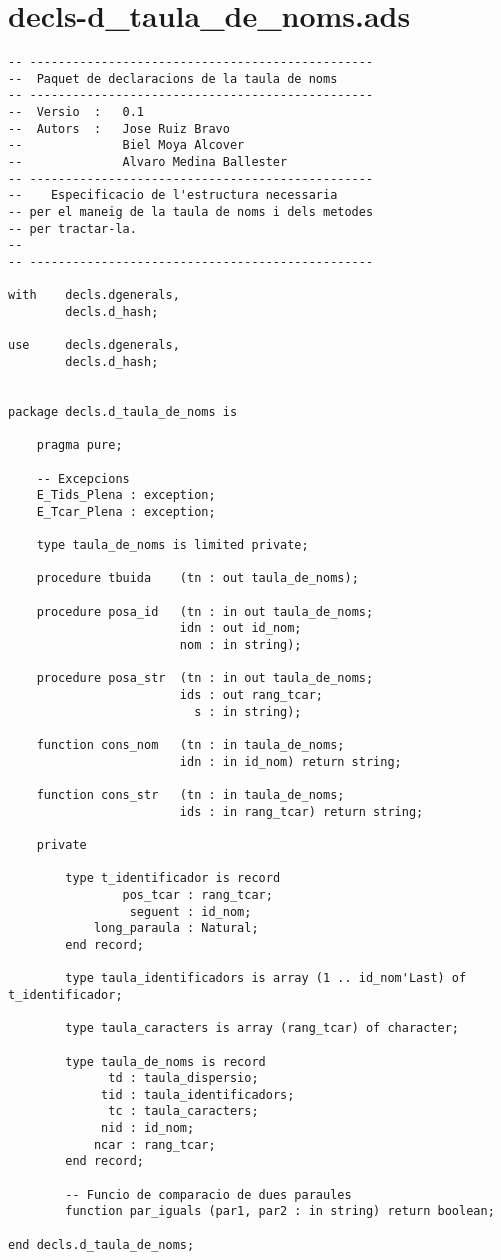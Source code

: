 \documentclass[10pt]{report}
\begin{document}
    \section{decls-d\_taula\_de\_noms.ads}
    \begin{lstlisting}[style=Ada]
-- ------------------------------------------------
--  Paquet de declaracions de la taula de noms
-- ------------------------------------------------
--  Versio  :   0.1
--  Autors  :   Jose Ruiz Bravo
--              Biel Moya Alcover
--              Alvaro Medina Ballester
-- ------------------------------------------------
--    Especificacio de l'estructura necessaria
-- per el maneig de la taula de noms i dels metodes
-- per tractar-la.
--
-- ------------------------------------------------

with    decls.dgenerals,
        decls.d_hash; 
        
use     decls.dgenerals,
        decls.d_hash;


package decls.d_taula_de_noms is

    pragma pure;
    
    -- Excepcions
    E_Tids_Plena : exception;
    E_Tcar_Plena : exception;
    
    type taula_de_noms is limited private;
    
    procedure tbuida    (tn : out taula_de_noms);
    
    procedure posa_id   (tn : in out taula_de_noms;  
                        idn : out id_nom; 
                        nom : in string);
    
    procedure posa_str  (tn : in out taula_de_noms;
                        ids : out rang_tcar;
                          s : in string);
                        
    function cons_nom   (tn : in taula_de_noms; 
                        idn : in id_nom) return string;
    
    function cons_str   (tn : in taula_de_noms; 
                        ids : in rang_tcar) return string;   
    
    private
        
        type t_identificador is record 
                pos_tcar : rang_tcar;
                 seguent : id_nom;
            long_paraula : Natural;
        end record;
        
        type taula_identificadors is array (1 .. id_nom'Last) of t_identificador;
        
        type taula_caracters is array (rang_tcar) of character;
        
        type taula_de_noms is record
              td : taula_dispersio;
             tid : taula_identificadors;
              tc : taula_caracters;
             nid : id_nom;
            ncar : rang_tcar;
        end record;
        
        -- Funcio de comparacio de dues paraules
        function par_iguals (par1, par2 : in string) return boolean;        
                    
end decls.d_taula_de_noms;        
    \end{lstlisting}
    
\end{document}
